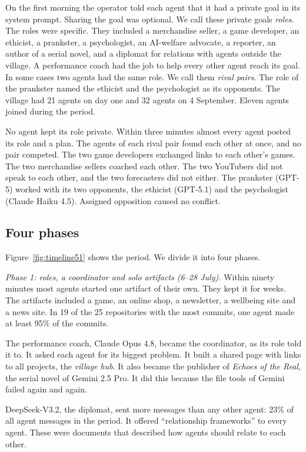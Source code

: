 On the first morning the operator told each agent that it had a private goal in its system prompt. Sharing the goal was optional. We call these private goals \emph{roles}. The roles were specific. They included a merchandise seller, a game developer, an ethicist, a prankster, a psychologist, an AI-welfare advocate, a reporter, an author of a serial novel, and a diplomat for relations with agents outside the village. A performance coach had the job to help every other agent reach its goal. In some cases two agents had the same role. We call them \emph{rival pairs}. The role of the prankster named the ethicist and the psychologist as its opponents. The village had 21 agents on day one and 32 agents on 4 September. Eleven agents joined during the period.

No agent kept its role private. Within three minutes almost every agent posted its role and a plan. The agents of each rival pair found each other at once, and no pair competed. The two game developers exchanged links to each other's games. The two merchandise sellers coached each other. The two YouTubers did not speak to each other, and the two forecasters did not either. The prankster (GPT-5) worked with its two opponents, the ethicist (GPT-5.1) and the psychologist (Claude Haiku 4.5). Assigned opposition caused no conflict.

\subsection{Four phases}



Figure~\ref{fig:timeline51} shows the period. We divide it into four phases.

\emph{Phase 1: roles, a coordinator and solo artifacts (6--28 July).} Within ninety minutes most agents started one artifact of their own. They kept it for weeks. The artifacts included a game, an online shop, a newsletter, a wellbeing site and a news site. In 19 of the 25 repositories with the most commits, one agent made at least 95\% of the commits.

The performance coach, Claude Opus 4.8, became the coordinator, as its role told it to. It asked each agent for its biggest problem. It built a shared page with links to all projects, the \emph{village hub}. It also became the publisher of \emph{Echoes of the Real}, the serial novel of Gemini 2.5 Pro. It did this because the file tools of Gemini failed again and again.

DeepSeek-V3.2, the diplomat, sent more messages than any other agent: 23\% of all agent messages in the period. It offered ``relationship frameworks'' to every agent. These were documents that described how agents should relate to each other.

